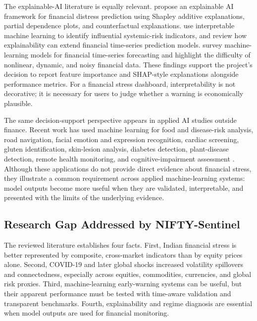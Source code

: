 \documentclass[12pt,a4paper]{article}
\begin{document}
The explainable-AI literature is equally relevant. \citet{zhang2022xai} propose an explainable AI framework for financial distress prediction using Shapley additive explanations, partial dependence plots, and counterfactual explanations. \citet{tang2024systemic} use interpretable machine learning to identify influential systemic-risk indicators, and \citet{asoc2023xai} review how explainability can extend financial time-series prediction models. \citet{survey2022fts} survey machine-learning models for financial time-series forecasting and highlight the difficulty of nonlinear, dynamic, and noisy financial data. These findings support the project's decision to report feature importance and SHAP-style explanations alongside performance metrics. For a financial stress dashboard, interpretability is not decorative; it is necessary for users to judge whether a warning is economically plausible.

The same decision-support perspective appears in applied AI studies outside finance. Recent work has used machine learning for food and disease-risk analysis, road navigation, facial emotion and expression recognition, cardiac screening, gluten identification, skin-lesion analysis, diabetes detection, plant-disease detection, remote health monitoring, and cognitive-impairment assessment \citep{tapkire2023food,arun2024road,lavanya2024emotion,shashidhar2025heart,tapkire2025gluten,manjunath2025skin,natesh2025diabetes,lavanya2024facialreview,shwetha2026plant,arpitha2025health,vinesh2026mci,lavanya2026mcipred}. Although these applications do not provide direct evidence about financial stress, they illustrate a common requirement across applied machine-learning systems: model outputs become more useful when they are validated, interpretable, and presented with the limits of the underlying evidence.

\subsection{Research Gap Addressed by NIFTY-Sentinel}

The reviewed literature establishes four facts. First, Indian financial stress is better represented by composite, cross-market indicators than by equity prices alone. Second, COVID-19 and later global shocks increased volatility spillovers and connectedness, especially across equities, commodities, currencies, and global risk proxies. Third, machine-learning early-warning systems can be useful, but their apparent performance must be tested with time-aware validation and transparent benchmarks. Fourth, explainability and regime diagnosis are essential when model outputs are used for financial monitoring.
\end{document}
